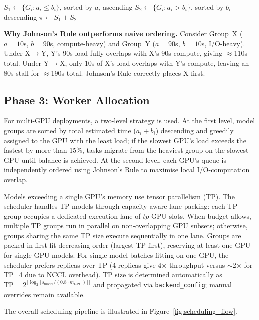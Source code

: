 \documentclass[logo,bsc,singlespacing,parskip,online]{infthesis}
\begin{document}
\begin{algorithmic}
\STATE $S_1 \gets \{G_i : a_i \leq b_i\}$, sorted by $a_i$ ascending
\STATE $S_2 \gets \{G_i : a_i > b_i\}$, sorted by $b_i$ descending
\STATE $\pi \gets S_1 + S_2$
\end{algorithmic}

\textbf{Why Johnson's Rule outperforms naive ordering.} Consider Group~X ($a=10$s, $b=90$s, compute-heavy) and Group~Y ($a=90$s, $b=10$s, I/O-heavy). Under X$\to$Y, Y's 90s load fully overlaps with X's 90s compute, giving $\approx$110s total. Under Y$\to$X, only 10s of X's load overlaps with Y's compute, leaving an 80s stall for $\approx$190s total. Johnson's Rule correctly places X first.

\subsection{Phase 3: Worker Allocation}
\label{sec:worker_allocation}

For multi-GPU deployments, a two-level strategy is used. At the first level, model groups are sorted by total estimated time ($a_i + b_i$) descending and greedily assigned to the GPU with the least load; if the slowest GPU's load exceeds the fastest by more than 15\%, tasks migrate from the heaviest group on the slowest GPU until balance is achieved. At the second level, each GPU's queue is independently ordered using Johnson's Rule to maximise local I/O-computation overlap.

Models exceeding a single GPU's memory use tensor parallelism (TP). The scheduler handles TP models through capacity-aware lane packing: each TP group occupies a dedicated execution lane of $\textit{tp}$ GPU slots. When budget allows, multiple TP groups run in parallel on non-overlapping GPU subsets; otherwise, groups sharing the same TP size execute sequentially in one lane. Groups are packed in first-fit decreasing order (largest TP first), reserving at least one GPU for single-GPU models. For single-model batches fitting on one GPU, the scheduler prefers replicas over TP (4 replicas give 4$\times$ throughput versus $\sim$2$\times$ for TP=4 due to NCCL overhead). TP size is determined automatically as $\text{TP} = 2^{\lceil \log_2 \lceil s_{\text{model}} / (0.8 \cdot m_{\text{GPU}}) \rceil \rceil}$ and propagated via \texttt{backend\_config}; manual overrides remain available.

The overall scheduling pipeline is illustrated in Figure~\ref{fig:scheduling_flow}.
\end{document}
